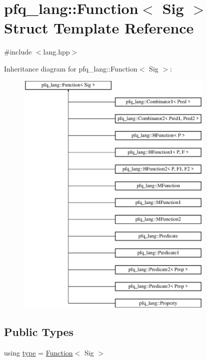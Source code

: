 \hypertarget{structpfq__lang_1_1Function}{\section{pfq\+\_\+lang\+:\+:Function$<$ Sig $>$ Struct Template Reference}
\label{structpfq__lang_1_1Function}
}


{\ttfamily \#include $<$lang.\+hpp$>$}

Inheritance diagram for pfq\+\_\+lang\+:\+:Function$<$ Sig $>$\+:\begin{figure}[H]
\begin{center}
\leavevmode
\includegraphics[height=12.000000cm]{structpfq__lang_1_1Function}
\end{center}
\end{figure}
\subsection*{Public Types}
\begin{DoxyCompactItemize}
\item 
using \hyperlink{structpfq__lang_1_1Function_a084321c040f1cec047e0c6ae0c5ec8bd}{type} = \hyperlink{structpfq__lang_1_1Function}{Function}$<$ Sig $>$
\end{DoxyCompactItemize}


